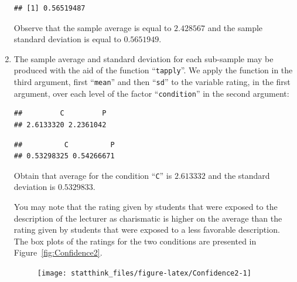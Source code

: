 \documentclass[]{krantz}
\makeatletter
\newenvironment{Shaded}{\begin{snugshade}}{\end{snugshade}}
\newcommand{\KeywordTok}[1]{\textcolor[rgb]{0.13,0.29,0.53}{\textbf{#1}}}
\newcommand{\NormalTok}[1]{#1}
\newcommand{\OperatorTok}[1]{\textcolor[rgb]{0.81,0.36,0.00}{\textbf{#1}}}
\newenvironment{kframe}{%
\medskip{}
\setlength{\fboxsep}{.8em}
 \def\at@end@of@kframe{}%
 \ifinner\ifhmode%
  \def\at@end@of@kframe{\end{minipage}}%
  \begin{minipage}{\columnwidth}%
 \fi\fi%
 \def\FrameCommand##1{\hskip\@totalleftmargin \hskip-\fboxsep
 \colorbox{shadecolor}{##1}\hskip-\fboxsep
     \hskip-\linewidth \hskip-\@totalleftmargin \hskip\columnwidth}%
 \MakeFramed {\advance\hsize-\width
   \@totalleftmargin\z@ \linewidth\hsize
   \@setminipage}}%
 {\par\unskip\endMakeFramed%
 \at@end@of@kframe}
\renewenvironment{Shaded}{\begin{kframe}}{\end{kframe}}
\theoremstyle{definition}
\theoremstyle{definition}
\theoremstyle{definition}
\theoremstyle{remark}
\makeatother
\begin{document}
\begin{enumerate}
\begin{verbatim}
## [1] 0.56519487
\end{verbatim}

  Observe that the sample average is equal to \(2.428567\) and the sample
  standard deviation is equal to \(0.5651949\).
\item
  The sample average and standard
  deviation for each sub-sample may be produced with the aid of the
  function ``\texttt{tapply}''. We apply the function in the third argument, first
  ``\texttt{mean}'' and then ``\texttt{sd}'' to the variable rating, in the first argument,
  over each level of the factor ``\texttt{condition}'' in the second argument:

\begin{Shaded}
\end{Shaded}

\begin{verbatim}
##         C         P 
## 2.6133320 2.2361042
\end{verbatim}

\begin{Shaded}
\end{Shaded}

\begin{verbatim}
##          C          P 
## 0.53298325 0.54266671
\end{verbatim}

  Obtain that average for the condition ``\texttt{C}'' is \(2.613332\) and the
  standard deviation is \(0.5329833\).

  You may note that the rating given by students that were exposed to the
  description of the lecturer as charismatic is higher on the average than
  the rating given by students that were exposed to a less favorable
  description. The box plots of the ratings for the two conditions are
  presented in Figure~\ref{fig:Confidence2}.

  \begin{figure}

   {\centering \texttt{[image: statthink\_files/figure-latex/Confidence2-1]} 

}
\end{figure}
\end{enumerate}
\end{document}
